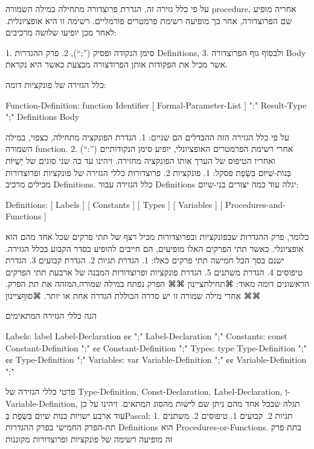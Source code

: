       על פי כלל גזירה זה, הגדרת פרוצדורה מתחילה במילה השמורה procedure, אחריה מופיע שם הפרוצדורה, אחר כך מופיעה רשימת פרמטרים פורמליים. רשימה זו היא אופציונלית. לאחר מכן יופיעו שלושה מרכיבים:

      1. סימן הנקודה ופסיק (”;“),
      2. פרק ההגדרות Definitions,
      3. ולבסוף גוף הפרוצדורה Body אשר מכיל את הפקודות אותן הפרודצורה מבצעת כאשר היא נקראת.

      כלל הגזירה של פונקציות דומה:

      Function-Definition:
      function Identifier [ Formal-Parameter-List ] ":" Result-Type ";" Definitions Body

      על פי כלל הגזירה הזה ההבדלים הם שניים:
      1. הגדרת הפונקציה מתחילה, כצפוי, במילה השמורה function.
      2. אחרי רשימת הפרמטרים האופציונלי, יופיע סימן הנקודותיים (”:“) ואחריו הטיפוס של הערך אותו הפונקציה מחזירה.
      זיהינו עד כה שני סוגים של יֵשֻׁיּוֹת בְּנוֹת-שִׁיּוּם בִּשְׂפַת פסקל:
      1. פונקציות
      2. פרוצדורות
      כללי הגזירה של פונקציות ופרוצדורות מכילים מרכיב Definitions. כלל הגזירה עבור Definitions יגלה עוד כמה יצורים בני-שיום:

      Definitions:
      [ Labels ] [ Constants ] [ Types ] [ Variables ] [ Procedures-and-Functions ]

      כלומר, פרק ההגדרות שבפונקציות ובפרוצדורות מכיל רצף של תתי פרקים שכל אחד מהם הוא אופציונלי. כאשר תתי הפרקים האלו מופיעים, הם חייבים להופיע בסדר הקבוע בכלל הגזירה.
      ישנם בסך הכל חמישה תתי פרקים כאלו:
      1. הגדרת תגיות
      2. הגדרת קבועים
      3. הגדרת טיפוסים
      4. הגדרת משתנים
      5. הגדרת פונקציות ופרוצדורות
      המבנה של ארבעת תתי הפרקים הראשונים דומה מאוד:
      ⌘תחילת{ציינון}
      ⌘⌘ הפרק נפתח במילה שמורה,המזהה את תת הפרק.
      ⌘⌘ אחרי מילה שמורה זו יש סדרה הכוללת הגדרה אחת או יותר.
    ⌘סוף{ציינון}

      הנה כללי הגזירה המתאימים

      Labels:
      label Label-Declaration {¢¢ ";" Label-Declaration } ";"
      Constants:
      const Constant-Definition ";" {¢¢ Constant-Definition ";" }
      Types:
      type Type-Definition ";" {¢¢ Type-Definition ";" }
      Variables:
      var Variable-Definition ";" {¢¢ Variable-Definition ";" }

      פרטי כללי הגזירה של Type-Definition, Const-Declaration, Label-Declaration, וְ-Variable-Definition, תגלה שבכל אחד מהם ניתן שם לישות מהסוג המתאים. זיהינו על כן עוד ארבע ישויות בנות שיום בִּשְׂפַת בְּPascal:
      1. תגיות
      2. קבועים
      1. טיפוסים
      2. משתנים
      תת-הפרק החמישי בפרק ההגדרות Definitions הוא Procedures-or-Functions. בתת פרק זה מופיעה רשימה של פונקציות ופרוצדורות מקוננות

